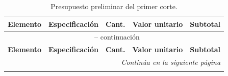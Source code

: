 \begin{longtable}{@{}p{4.6cm}p{6cm}crr@{}}
\caption{Presupuesto preliminar del primer corte.}
\label{tab:presupuesto_preliminar} \\
\toprule
\textbf{Elemento} & \textbf{Especificación} & \textbf{Cant.} & \textbf{Valor unitario} & \textbf{Subtotal} \\
\midrule
\endfirsthead
 
\multicolumn{5}{c}{\tablename\ \thetable{} -- continuación} \\
\toprule
\textbf{Elemento} & \textbf{Especificación} & \textbf{Cant.} & \textbf{Valor unitario} & \textbf{Subtotal} \\
\midrule
\endhead
 
\midrule
\multicolumn{5}{r}{\textit{Continúa en la siguiente página}} \\
\endfoot
 
\bottomrule
\endlastfoot
 

\end{longtable}
